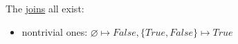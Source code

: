 The \href{doc/1 math/Seven Sketches in Compositionality/Chapter 1: Generative Effects/5 Meets and joins/1 Definition and basic examples/Meet and join}{joins} all exist:
\begin{itemize}
  \item nontrivial ones: $\varnothing \mapsto False, \{True,False\}\mapsto True$
\end{itemize}